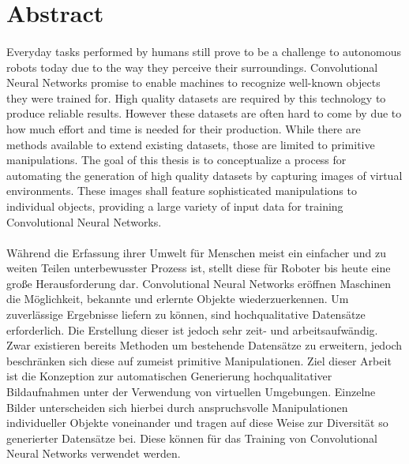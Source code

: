 \chapter*{Abstract}
\subsubsection*{\hsmatitelen}
Everyday tasks performed by humans still prove to be a challenge to autonomous robots today due to the way they perceive their surroundings. Convolutional Neural Networks promise to enable machines to recognize well-known objects they were trained for. High quality datasets are required by this technology to produce reliable results. However these datasets are often hard to come by due to how much effort and time is needed for their production. While there are methods available to extend existing datasets, those are limited to primitive manipulations. The goal of this thesis is to conceptualize a process for automating the generation of high quality datasets by capturing images of virtual environments. These images shall feature sophisticated manipulations to individual objects, providing a large variety of input data for training Convolutional Neural Networks.

\subsubsection*{\hsmatitelde}
Während die Erfassung ihrer Umwelt für Menschen meist ein einfacher und zu weiten Teilen unterbewusster Prozess ist, stellt diese für Roboter bis heute eine große Herausforderung dar. Convolutional Neural Networks eröffnen Maschinen die Möglichkeit, bekannte und erlernte Objekte wiederzuerkennen. Um zuverlässige Ergebnisse liefern zu können, sind hochqualitative Datensätze erforderlich. Die Erstellung dieser ist jedoch sehr zeit- und arbeitsaufwändig. Zwar existieren bereits Methoden um bestehende Datensätze zu erweitern, jedoch beschränken sich diese auf zumeist primitive Manipulationen. Ziel dieser Arbeit ist die Konzeption zur automatischen Generierung hochqualitativer Bildaufnahmen unter der Verwendung von virtuellen Umgebungen. Einzelne Bilder unterscheiden sich hierbei durch anspruchsvolle Manipulationen individueller Objekte voneinander und tragen auf diese Weise zur Diversität so generierter Datensätze bei. Diese können für das Training von Convolutional Neural Networks verwendet werden.